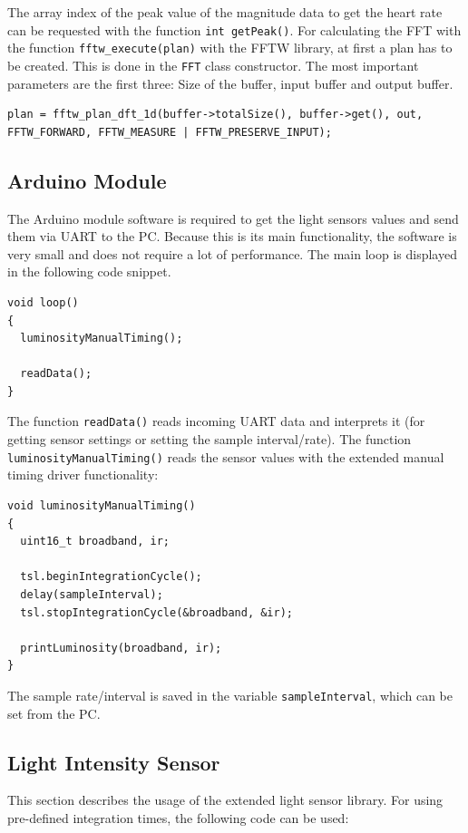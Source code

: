 \documentclass[notitlepage]{scrreprt}
\begin{document}
The array index of the peak value of the magnitude data to get the heart rate can be requested with the function \lstinline$int getPeak()$. For calculating the FFT with the function \lstinline$fftw_execute(plan)$ with the FFTW library, at first a plan has to be created. This is done in the \lstinline$FFT$ class constructor. The most important parameters are the first three: Size of the buffer, input buffer and output buffer.

\begin{lstlisting}[caption=FFT.c]
plan = fftw_plan_dft_1d(buffer->totalSize(), buffer->get(), out, FFTW_FORWARD, FFTW_MEASURE | FFTW_PRESERVE_INPUT);
\end{lstlisting}

\subsection{Arduino Module}
The Arduino module software is required to get the light sensors values and send them via UART to the PC. Because this is its main functionality, the software is very small and does not require a lot of performance. The main loop is displayed in the following code snippet.

\begin{lstlisting}
void loop()
{ 
  luminosityManualTiming();
  
  readData();
}
\end{lstlisting}

The function \lstinline$readData()$ reads incoming UART data and interprets it (for getting sensor settings or setting the sample interval/rate). The function \lstinline$luminosityManualTiming()$ reads the sensor values with the extended manual timing driver functionality:

\newpage

\begin{lstlisting}
void luminosityManualTiming()
{
  uint16_t broadband, ir;
  
  tsl.beginIntegrationCycle();
  delay(sampleInterval);
  tsl.stopIntegrationCycle(&broadband, &ir);
  
  printLuminosity(broadband, ir);
}
\end{lstlisting}

The sample rate/interval is saved in the variable \lstinline$sampleInterval$, which can be set from the PC.

\subsection{Light Intensity Sensor}
This section describes the usage of the extended light sensor library. For using pre-defined integration times, the following code can be used:
\end{document}
